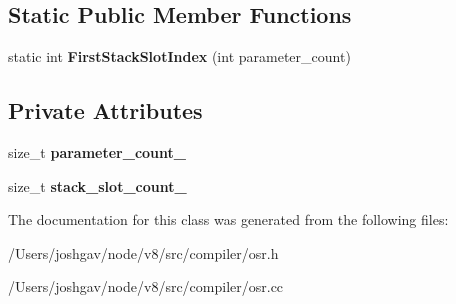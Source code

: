 \subsection*{Static Public Member Functions}
\begin{DoxyCompactItemize}
\item 
static int {\bfseries First\+Stack\+Slot\+Index} (int parameter\+\_\+count)\hypertarget{classv8_1_1internal_1_1compiler_1_1_osr_helper_af29916c27892b27a638e383c5214b090}{}\label{classv8_1_1internal_1_1compiler_1_1_osr_helper_af29916c27892b27a638e383c5214b090}

\end{DoxyCompactItemize}
\subsection*{Private Attributes}
\begin{DoxyCompactItemize}
\item 
size\+\_\+t {\bfseries parameter\+\_\+count\+\_\+}\hypertarget{classv8_1_1internal_1_1compiler_1_1_osr_helper_a10a0859cc719bf4b524e03f6952c676d}{}\label{classv8_1_1internal_1_1compiler_1_1_osr_helper_a10a0859cc719bf4b524e03f6952c676d}

\item 
size\+\_\+t {\bfseries stack\+\_\+slot\+\_\+count\+\_\+}\hypertarget{classv8_1_1internal_1_1compiler_1_1_osr_helper_a7d71b0f8215dee3f831d9026475f7076}{}\label{classv8_1_1internal_1_1compiler_1_1_osr_helper_a7d71b0f8215dee3f831d9026475f7076}

\end{DoxyCompactItemize}


The documentation for this class was generated from the following files\+:\begin{DoxyCompactItemize}
\item 
/\+Users/joshgav/node/v8/src/compiler/osr.\+h\item 
/\+Users/joshgav/node/v8/src/compiler/osr.\+cc\end{DoxyCompactItemize}
